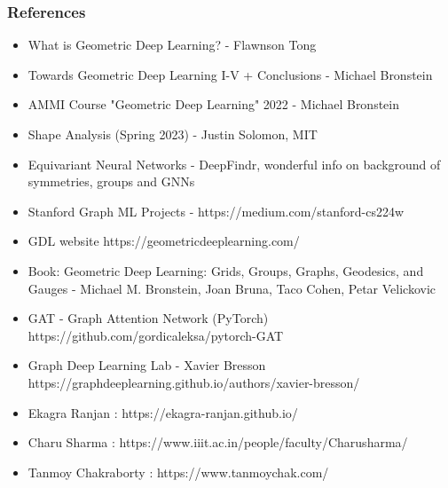 \begin{frame}[fragile]\frametitle{References}

\begin{itemize}
\item What is Geometric Deep Learning? - Flawnson Tong
\item Towards Geometric Deep Learning I-V + Conclusions - Michael Bronstein
\item AMMI Course "Geometric Deep Learning" 2022 - Michael Bronstein
\item Shape Analysis (Spring 2023) -  Justin Solomon, MIT
\item Equivariant Neural Networks - DeepFindr, wonderful info on background of symmetries, groups and GNNs
\item Stanford Graph ML Projects - https://medium.com/stanford-cs224w
\item GDL website https://geometricdeeplearning.com/
\item Book: Geometric Deep Learning: Grids, Groups, Graphs, Geodesics, and Gauges - Michael M. Bronstein, Joan Bruna, Taco Cohen, Petar Velickovic
\item GAT - Graph Attention Network (PyTorch) https://github.com/gordicaleksa/pytorch-GAT
\item Graph Deep Learning Lab - Xavier Bresson https://graphdeeplearning.github.io/authors/xavier-bresson/
\item Ekagra Ranjan : https://ekagra-ranjan.github.io/
\item Charu Sharma : https://www.iiit.ac.in/people/faculty/Charusharma/
\item Tanmoy Chakraborty : https://www.tanmoychak.com/
\end{itemize}
	  
\end{frame}


